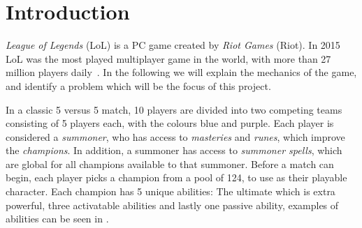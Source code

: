 \section{Introduction}\label{sec:intro}



\emph{League of Legends} (LoL) is a PC game created by \emph{Riot Games} (Riot). In  2015 LoL was the most played multiplayer game in the world, with more than 27 million players daily~\cite{LoL27mill,LoLmostplayed}. 
In the following we will explain the mechanics of the game, and identify a problem which will be the focus of this project. 

In a classic 5 versus 5 match, 10 players are divided into two competing teams consisting of 5 players each, with the colours blue and purple. Each player is considered a \emph{summoner}, who has access to \emph{masteries} and \emph{runes}, which improve the \emph{champions}. In addition, a summoner has access to \emph{summoner spells}, which are global for all champions available to that summoner. Before a match can begin, each player picks a champion from a pool of 124, to use as their playable character. Each champion has 5 unique abilities: The ultimate which is extra powerful, three activatable abilities and lastly one passive ability, examples of abilities can be seen in .

